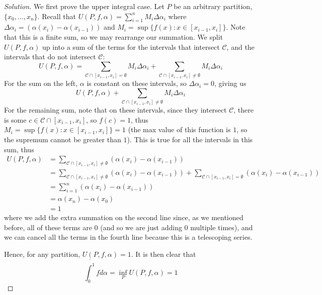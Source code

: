 \documentclass{article}
\begin{document}
\begin{proof}[Solution]\let\qed\relax
	We first prove the upper integral case.
	Let $P$ be an arbitrary partition, $\{x_0,\dots,x_n\}$.
	Recall that $U(P,f,\alpha) = \sum_{i=1}^n M_i\Delta\alpha_i$
	where $\Delta\alpha_i = (\alpha(x_i) - \alpha(x_{i-1}))$
	and $M_i = \sup\{f(x) \colon x \in [x_{i-1},x_i]\}$.
	Note that this is a finite sum, so we may rearrange our summation.
	We split $U(P,f,\alpha)$ up into a sum of the terms for the intervals
	that intersect $\mathcal{C}$, and the intervals that do not intersect $\mathcal{C}$:
	\[
		U(P,f,\alpha)
		= \sum_{\mathcal{C} \cap [x_{i-1},x_i]=\emptyset}M_i\Delta\alpha_i
		+ \sum_{\mathcal{C} \cap [x_{i-1},x_i]\neq\emptyset}M_i\Delta\alpha_i
	\]
	For the sum on the left, $\alpha$ is constant on these intervals,
	so $\Delta\alpha_i = 0$, giving us
	\[
		U(P,f,\alpha) + \sum_{\mathcal{C} \cap [x_{i-1},x_i]\neq\emptyset}M_i\Delta\alpha_i
	\]
	For the remaining sum, note that on these intervals,
	since they intersect $\mathcal{C}$, there is some $c \in \mathcal{C} \cap [x_{i-1},x_i]$,
	so $f(c) = 1$,
	thus $M_i = \sup\{f(x) \colon x \in [x_{i-1},x_i]\} = 1$
	(the max value of this function is $1$, so the supremum cannot be greater than $1$).
	This is true for all the intervals in this sum, thus
	\begin{align*}
		U(P,f,\alpha)
		&= \sum_{\mathcal{C}\cap[x_{i-1},x_i]\neq \emptyset}(\alpha(x_i) - \alpha(x_{i-1}))\\
		&= \sum_{\mathcal{C}\cap[x_{i-1},x_i]\neq \emptyset}(\alpha(x_i) - \alpha(x_{i-1}))
		+ \sum_{\mathcal{C}\cap[x_{i-1},x_i] = \emptyset}(\alpha(x_i) - \alpha(x_{i-1}))\\
		&= \sum_{i=1}^n(\alpha(x_i) - \alpha(x_{i-1}))\\
		&= \alpha(x_n) - \alpha(x_0)\\
		&= 1
	\end{align*}
	where we add the extra summation on the second line since,
	as we mentioned before, all of these terms are $0$
	(and so we are just adding $0$ multiple times),
	and we can cancel all the terms in the fourth line
	because this is a telescoping series.
	
	Hence, for any partition, $U(P,f,\alpha) = 1$.
	It is then clear that
	\[
		\overline{\int_0^1}fd\alpha = \inf_P U(P,f,\alpha) = 1
	\]


\end{proof}
\end{document}
